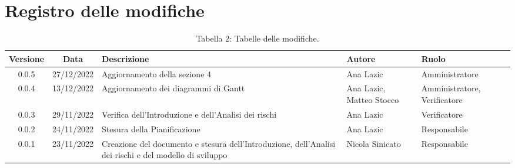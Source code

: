\section*{Registro delle modifiche}
\begin{table}[H]
	\centering
	\renewcommand\tabularxcolumn[1]{>{\Centering}m{#1}}
	\begin{tabularx}{\textwidth}{| c | c | X | X | X |} 
	\hline
	\textbf{Versione} & \textbf{Data} & \textbf{Descrizione} & \textbf{Autore} & \textbf{Ruolo}\\
    \hline
	0.0.5 & 27/12/2022 & Aggiornamento della sezione 4 & Ana Lazic & Amministratore\\
	\hline
	0.0.4 & 13/12/2022 & Aggiornamento dei diagrammi di Gantt & Ana Lazic, Matteo Stocco & Amministratore, Verificatore\\
	\hline
	0.0.3 & 29/11/2022 & Verifica dell'Introduzione e dell'Analisi dei rischi & Ana Lazic & Verificatore\\
	\hline
	0.0.2 & 24/11/2022 & Stesura della Pianificazione & Ana Lazic & Responsabile\\
	\hline
	0.0.1 & 23/11/2022 & Creazione del documento e stesura dell'Introduzione, dell'Analisi dei rischi e del modello di sviluppo & Nicola Sinicato & Responsabile\\
 	\hline
	\end{tabularx}
	\vspace{10pt}
	\caption{Tabella 2: Tabelle delle modifiche.}
\end{table}
